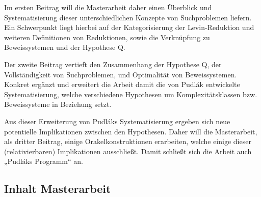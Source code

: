 \documentclass[nofonts]{uebung}
\begin{document}
Im ersten Beitrag will die Masterarbeit daher einen Überblick und Systematisierung dieser unterschiedlichen Konzepte von Suchproblemen liefern. Ein Schwerpunkt liegt hierbei auf der Kategorisierung der Levin-Reduktion und weiteren Definitionen von Reduktionen, sowie die Verknüpfung zu Beweissystemen und der Hypothese Q.

Der zweite Beitrag vertieft den Zusammenhang der Hypothese Q, der Vollständigkeit von Suchproblemen, und Optimalität von Beweissystemen. Konkret ergänzt und erweitert die Arbeit damit die von Pudlák entwickelte Systematisierung, welche verschiedene Hypothesen um Komplexitätsklassen bzw. Beweissysteme in Beziehung setzt.

Aus dieser Erweiterung von Pudláks Systematisierung ergeben sich neue potentielle Implikationen zwischen den Hypothesen. Daher will die Masterarbeit, als dritter Beitrag, einige Orakelkonstruktionen erarbeiten, welche einige dieser (relativierbaren) Implikationen ausschließt. Damit schließt sich die Arbeit auch „Pudláks Programm“ an.

\clearpage
\subsection*{Inhalt Masterarbeit}
\end{document}
